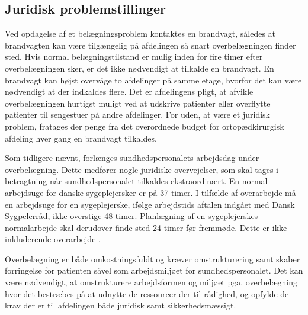 \subsection{Juridisk problemstillinger}
Ved opdagelse af et belægningsproblem kontaktes en brandvagt, således at brandvagten kan være tilgængelig på afdelingen så snart overbelægningen finder sted. Hvis normal belægningstilstand er mulig inden for fire timer efter overbelægningen sker, er det ikke nødvendigt at tilkalde en brandvagt. En brandvagt kan højst overvåge to afdelinger på samme etage, hvorfor det kan være nødvendigt at der indkaldes flere. Det er afdelingens pligt, at  afvikle overbelægningen hurtigst muligt ved at udskrive patienter eller overflytte patienter til sengestuer på andre afdelinger. \cite{Beredskab2016} For uden, at være et juridisk problem, fratages der penge fra det overordnede budget for ortopædkirurgisk afdeling hver gang en brandvagt tilkaldes.  

\noindent
Som tidligere nævnt, forlænges sundhedspersonalets arbejdsdag under overbelægning. Dette medfører nogle juridiske overvejelser, som skal tages i betragtning når sundhedspersonalet tilkaldes ekstraordinært. En normal arbejdsuge for danske sygeplejersker er på 37 timer. \cite{Danske2015} I tilfælde af overarbejde må en arbejdsuge for en sygeplejerske, ifølge arbejdstids aftalen indgået med Dansk Sygpelerråd, ikke overstige 48 timer. Planlægning af en sygeplejerskes normalarbejde skal derudover finde sted 24 timer før fremmøde. Dette er ikke inkluderende overarbejde . \cite{Danske2015}

\noindent

Overbelægning er både omkostningsfuldt og kræver omstrukturering samt skaber forringelse for patienten såvel som arbejdsmiljøet for sundhedspersonalet. Det kan være nødvendigt, at omstrukturere arbejdsformen og miljøet pga.  overbelægning hvor det bestræbes på at udnytte de ressourcer der til rådighed, og opfylde de krav der er til afdelingen både juridisk samt sikkerhedsmæssigt. 










